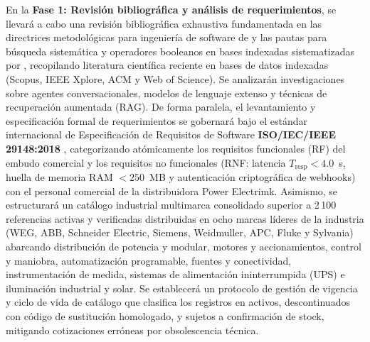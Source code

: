 En la \textbf{Fase 1: Revisión bibliográfica y análisis de requerimientos}, se llevará a cabo una revisión bibliográfica exhaustiva fundamentada en las directrices metodológicas para ingeniería de software de \textcite{kitchenham2007guidelines} y las pautas para búsqueda sistemática y operadores booleanos en bases indexadas sistematizadas por \textcite{llerena2025guia}, recopilando literatura científica reciente en bases de datos indexadas (Scopus, IEEE Xplore, ACM y Web of Science). Se analizarán investigaciones sobre agentes conversacionales, modelos de lenguaje extenso y técnicas de recuperación aumentada (RAG). De forma paralela, el levantamiento y especificación formal de requerimientos se gobernará bajo el estándar internacional de Especificación de Requisitos de Software \textbf{ISO/IEC/IEEE 29148:2018} \parencite{iso29148}, categorizando atómicamente los requisitos funcionales (RF) del embudo comercial y los requisitos no funcionales (RNF: latencia $T_{\text{resp}} < 4.0$~s, huella de memoria RAM $< 250$~MB y autenticación criptográfica de webhooks) con el personal comercial de la distribuidora Power Electrimk. Asimismo, se estructurará un catálogo industrial multimarca consolidado superior a 2\,100 referencias activas y verificadas distribuidas en ocho marcas líderes de la industria (WEG, ABB, Schneider Electric, Siemens, Weidmuller, APC, Fluke y Sylvania) abarcando distribución de potencia y modular, motores y accionamientos, control y maniobra, automatización programable, fuentes y conectividad, instrumentación de medida, sistemas de alimentación ininterrumpida (UPS) e iluminación industrial y solar. Se establecerá un protocolo de gestión de vigencia y ciclo de vida de catálogo que clasifica los registros en activos, descontinuados con código de sustitución homologado, y sujetos a confirmación de stock, mitigando cotizaciones erróneas por obsolescencia técnica.

